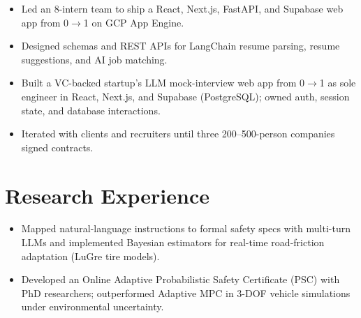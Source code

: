 \documentclass[11pt, letterpaper]{article}
\begin{document}
\vspace{1pt}
\begin{itemize}
  \item Led an 8-intern team to ship a React, Next.js, FastAPI, and Supabase web app from 0$\to$1 on GCP App Engine.
  \item Designed schemas and REST APIs for LangChain resume parsing, resume suggestions, and AI job matching.
\end{itemize}

\vspace{1pt}
\begin{itemize}
  \item Built a VC-backed startup's LLM mock-interview web app from 0$\to$1 as sole engineer in React, Next.js, and Supabase (PostgreSQL); owned auth, session state, and database interactions.
  \item Iterated with clients and recruiters until three 200--500-person companies signed contracts.
\end{itemize}

\section{Research Experience}
\begin{itemize}
  \item Mapped natural-language instructions to formal safety specs with multi-turn LLMs and implemented Bayesian estimators for real-time road-friction adaptation (LuGre tire models).
  \item Developed an Online Adaptive Probabilistic Safety Certificate (PSC) with PhD researchers; outperformed Adaptive MPC in 3-DOF vehicle simulations under environmental uncertainty.
\end{itemize}
\end{document}
